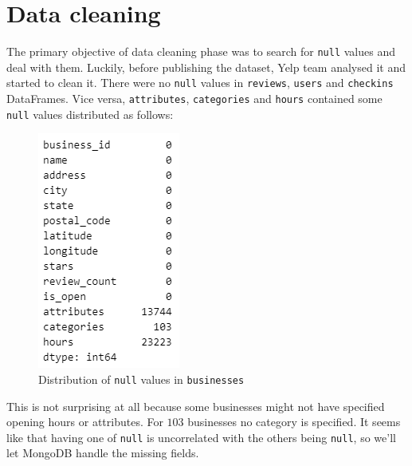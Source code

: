 \documentclass{Configuration_Files/PoliMi3i_thesis}
\begin{document}
\section{Data cleaning}
The primary objective of data cleaning phase was to search for \texttt{null} values and deal with them. Luckily, before publishing the dataset, Yelp team analysed it and started to clean it. There were no \texttt{null} values in \texttt{reviews}, \texttt{users} and \texttt{checkins} DataFrames. Vice versa, \texttt{attributes}, \texttt{categories} and \texttt{hours} contained some \texttt{null} values distributed as follows:
\begin{figure}[H]
    \centering
    \includegraphics[width=1\columnwidth / 3]{imgs/null_count_businesses.png}
    \caption{Distribution of \texttt{null} values in \texttt{businesses}}
    \label{fig:null_count_businesses}
\end{figure}
This is not surprising at all because some businesses might not have specified opening hours or attributes. For $103$ businesses no category is specified. It seems like that having one of \texttt{null} is uncorrelated with the others being \texttt{null}, so we'll let MongoDB handle the missing fields.
\end{document}
